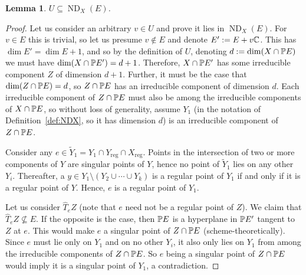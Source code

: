 \documentclass[a4paper,10pt]{article}
\def\reg{\text{reg}}
\DeclareMathOperator{\ND}{ND}
\newtheorem{lemma}[theorem]{Lemma}
\theoremstyle{definition}
\theoremstyle{remark}
\begin{document}
\begin{lemma}
    \label{lem:general}
    $U\subseteq \ND_X(E)$.
\end{lemma}
\begin{proof}
    Let us consider an arbitrary $v\in U$ and prove it lies in $\ND_X(E)$. For $v\in E$ this is trivial, so let us presume $v\notin E$ and denote $E':= E+v\ce$. This has $\dim E' = \dim E+1$, and so by the definition of $U$, denoting $d:=\dim(X\cap \pe E)$ we must have $\dim(X\cap \pe E') = d+1$. Therefore, $X\cap \pe E'$ has some irreducible component $Z$ of dimension $d+1$. Further, it must be the case that $\dim(Z\cap \pe E) = d$, so $Z\cap \pe E$ has an irreducible component of dimension $d$. Each irreducible component of $Z\cap \pe E$ must also be among the irreducible components of $X\cap \pe E$, so without loss of generality, assume $Y_1$ (in the notation of Definition~\ref{def:NDX}, so it has dimension $d$) is an irreducible component of $Z\cap\pe E$.

    Consider any $e\in \tilde Y_1 = Y_1\cap Y_\reg\cap X_\reg$. Points in the intersection of two or more components of $Y$ are singular points of $Y$, hence no point of $\tilde Y_1$ lies on any other $Y_i$. Thereafter, a $y\in Y_1\setminus (Y_2\cup\cdots\cup Y_k)$ is a regular point of $Y_1$ if and only if it is a regular point of $Y$. Hence, $e$ is a regular point of $Y_1$.

    Let us consider $\hat T_e Z$ (note that $e$ need not be a regular point of $Z$). We claim that $\hat T_eZ\nsubseteq E$. If the opposite is the case, then $\pe E$ is a hyperplane in $\pe E'$ tangent to $Z$ at $e$. This would make $e$ a singular point of $Z\cap \pe E$ (scheme-theoretically). Since $e$ must lie only on $Y_1$ and on no other $Y_i$, it also only lies on $Y_1$ from among the irreducible components of $Z\cap \pe E$. So $e$ being a singular point of $Z\cap \pe E$ would imply it is a singular point of $Y_1$, a contradiction.


\end{proof}
\end{document}
